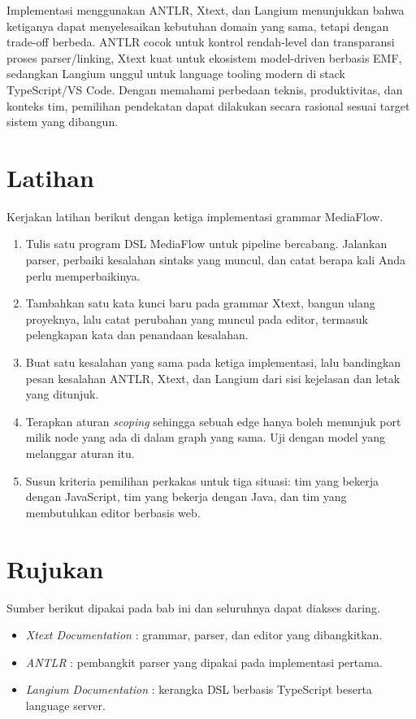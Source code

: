 Implementasi menggunakan ANTLR, Xtext, dan Langium menunjukkan bahwa ketiganya dapat menyelesaikan kebutuhan domain yang sama, tetapi dengan trade-off berbeda. ANTLR cocok untuk kontrol rendah-level dan transparansi proses parser/linking, Xtext kuat untuk ekosistem model-driven berbasis EMF, sedangkan Langium unggul untuk language tooling modern di stack TypeScript/VS Code. Dengan memahami perbedaan teknis, produktivitas, dan konteks tim, pemilihan pendekatan dapat dilakukan secara rasional sesuai target sistem yang dibangun.

\section{Latihan}

Kerjakan latihan berikut dengan ketiga implementasi grammar MediaFlow.

\begin{enumerate}
  \item Tulis satu program DSL MediaFlow untuk pipeline bercabang. Jalankan parser, perbaiki kesalahan sintaks yang muncul, dan catat berapa kali Anda perlu memperbaikinya.
  \item Tambahkan satu kata kunci baru pada grammar Xtext, bangun ulang proyeknya, lalu catat perubahan yang muncul pada editor, termasuk pelengkapan kata dan penandaan kesalahan.
  \item Buat satu kesalahan yang sama pada ketiga implementasi, lalu bandingkan pesan kesalahan ANTLR, Xtext, dan Langium dari sisi kejelasan dan letak yang ditunjuk.
  \item Terapkan aturan \textit{scoping} sehingga sebuah edge hanya boleh menunjuk port milik node yang ada di dalam graph yang sama. Uji dengan model yang melanggar aturan itu.
  \item Susun kriteria pemilihan perkakas untuk tiga situasi: tim yang bekerja dengan JavaScript, tim yang bekerja dengan Java, dan tim yang membutuhkan editor berbasis web.
\end{enumerate}

\section{Rujukan}

Sumber berikut dipakai pada bab ini dan seluruhnya dapat diakses daring.

\begin{itemize}
  \item \textit{Xtext Documentation} \cite{doc-xtext}: grammar, parser, dan editor yang dibangkitkan.
  \item \textit{ANTLR} \cite{doc-antlr}: pembangkit parser yang dipakai pada implementasi pertama.
  \item \textit{Langium Documentation} \cite{doc-langium}: kerangka DSL berbasis TypeScript beserta language server.
\end{itemize}
